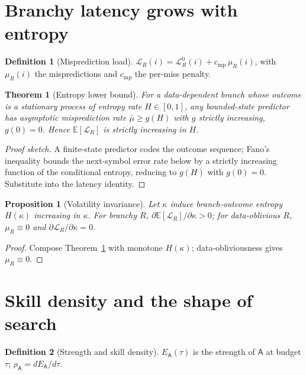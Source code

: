 \documentclass[11pt,oneside]{book}
\theoremstyle{definition}
\newtheorem{definition}{Definition}[chapter]
\theoremstyle{plain}
\newtheorem{theorem}{Theorem}[chapter]
\newtheorem{proposition}{Proposition}[chapter]
\theoremstyle{remark}
\newcommand{\Lat}{\mathcal{L}}
\newcommand{\Elo}{E}
\newcommand{\Engine}{\mathsf{A}}
\newcommand{\budget}{\tau}
\newcommand{\kvol}{\kappa}
\newcommand{\skill}{\rho}
\newcommand{\Expect}{\mathbb{E}}
\newcommand{\Ent}{H}
\begin{document}
\section{Branchy latency grows with entropy}
\begin{definition}[Misprediction load]
$\Lat_R(i)=\Lat^0_R(i)+c_{\mathrm{mp}}\,\mu_R(i)$, with $\mu_R(i)$ the mispredictions and
$c_{\mathrm{mp}}$ the per-miss penalty.
\end{definition}

\begin{theorem}[Entropy lower bound]\label{thm:entropy}
For a data-dependent branch whose outcome is a stationary process of entropy rate
$\Ent\in[0,1]$, any bounded-state predictor has asymptotic misprediction rate
$\bar\mu\ge g(\Ent)$ with $g$ strictly increasing, $g(0)=0$. Hence $\Expect[\Lat_R]$ is
strictly increasing in $\Ent$.
\end{theorem}
\begin{proof}[Proof sketch]
A finite-state predictor codes the outcome sequence; Fano's inequality bounds the
next-symbol error rate below by a strictly increasing function of the conditional entropy,
reducing to $g(\Ent)$ with $g(0)=0$. Substitute into the latency identity.
\end{proof}

\begin{proposition}[Volatility invariance]\label{prop:vol}
Let $\kvol$ induce branch-outcome entropy $\Ent(\kvol)$ increasing in $\kvol$. For branchy
$R$, $\partial\Expect[\Lat_R]/\partial\kvol>0$; for data-oblivious $R$, $\mu_R\equiv0$ and
$\partial\Lat_R/\partial\kvol=0$.
\end{proposition}
\begin{proof}
Compose Theorem~\ref{thm:entropy} with monotone $\Ent(\kvol)$; data-obliviousness gives
$\mu_R\equiv0$.
\end{proof}

\section{Skill density and the shape of search}
\begin{definition}[Strength and skill density]
$\Elo_\Engine(\budget)$ is the strength of $\Engine$ at budget $\budget$;
$\skill_\Engine=d\Elo_\Engine/d\budget$.
\end{definition}
\end{document}
